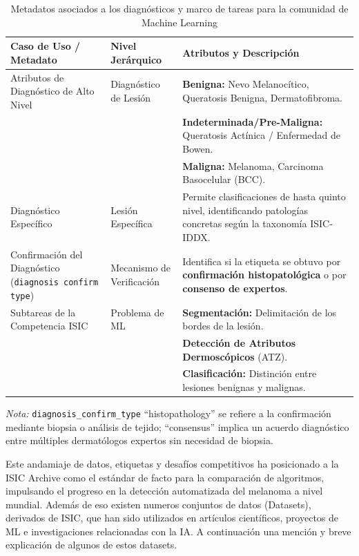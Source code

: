\begin{table}[ht]
    \centering
    \caption{Metadatos asociados a los diagnósticos y marco de tareas para la comunidad de Machine Learning}
    \label{tab:isic_atributos}
    \begin{tabularx}{\textwidth}{|>{\raggedright\arraybackslash}p{3.2cm}|>{\raggedright\arraybackslash}p{2.8cm}|>{\raggedright\arraybackslash}X|}
        \hline
        \textbf{Caso de Uso / Metadato} & \textbf{Nivel Jerárquico} & \textbf{Atributos y Descripción} \\
        \hline
        Atributos de Diagnóstico de Alto Nivel & Diagnóstico de Lesión & \textbf{Benigna:} Nevo Melanocítico, Queratosis Benigna, Dermatofibroma. \\
        & & \textbf{Indeterminada/Pre-Maligna:} Queratosis Actínica / Enfermedad de Bowen. \\
        & & \textbf{Maligna:} Melanoma, Carcinoma Basocelular (BCC). \\
        \hline
        Diagnóstico Específico & Lesión Específica & Permite clasificaciones de hasta quinto nivel, identificando patologías concretas según la taxonomía ISIC-IDDX. \\
        \hline
        Confirmación del Diagnóstico (\texttt{diagnosis confirm type}) & Mecanismo de Verificación & Identifica si la etiqueta se obtuvo por \textbf{confirmación histopatológica} o por \textbf{consenso de expertos}. \\
        \hline
        Subtareas de la Competencia ISIC & Problema de ML & \textbf{Segmentación:} Delimitación de los bordes de la lesión. \\
        & & \textbf{Detección de Atributos Dermoscópicos} (ATZ). \\
        & & \textbf{Clasificación:} Distinción entre lesiones benignas y malignas. \\
        \hline
    \end{tabularx}
    \small{\textit{Nota:} \texttt{diagnosis\_confirm\_type} ``histopathology'' se refiere a la confirmación mediante biopsia o análisis de tejido; ``consensus'' implica un acuerdo diagnóstico entre múltiples dermatólogos expertos sin necesidad de biopsia.}
\end{table}

Este andamiaje de datos, etiquetas y desafíos competitivos ha posicionado a la ISIC Archive 
como el estándar de facto para la comparación de algoritmos, impulsando el progreso en la 
detección automatizada del melanoma a nivel mundial. Adem\'as de eso existen numeros conjuntos
de datos (Datasets), derivados de ISIC, que han sido utilizados en art\'iculos cient\'ificos,
proyectos de ML e investigaciones relacionadas con la IA. A continuaci\'on una menci\'on y breve
explicaci\'on de algunos de estos datasets.

